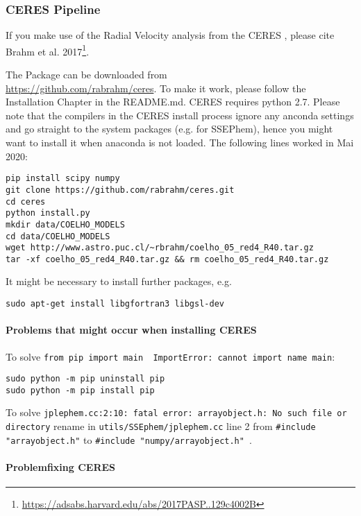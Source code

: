 \documentclass[10pt,a4paper]{article}
\begin{document}
\subsubsection{CERES Pipeline}
\label{Section:Explanation_CERES_pipeline}
If you make use of the Radial Velocity analysis from the CERES , please cite Brahm et al. 2017\footnote{\url{https://adsabs.harvard.edu/abs/2017PASP..129c4002B}}.

The Package can be downloaded from\\ \url{https://github.com/rabrahm/ceres}. To make it work, please follow the Installation Chapter in the README.md. CERES requires python 2.7. Please note that the compilers in the CERES install process ignore any anconda settings and go straight to the system packages (e.g. for SSEPhem), hence you might want to install it when anaconda is not loaded. The following lines worked in Mai 2020:
\begin{lstlisting}[style=base]
pip install scipy numpy
git clone https://github.com/rabrahm/ceres.git
cd ceres
python install.py
mkdir data/COELHO_MODELS
cd data/COELHO_MODELS
wget http://www.astro.puc.cl/~rbrahm/coelho_05_red4_R40.tar.gz
tar -xf coelho_05_red4_R40.tar.gz && rm coelho_05_red4_R40.tar.gz
\end{lstlisting}

It might be necessary to install further packages, e.g.
\begin{lstlisting}[style=base]
sudo apt-get install libgfortran3 libgsl-dev
\end{lstlisting}


\paragraph{Problems that might occur when installing CERES\\}

To solve \verb|from pip import main  ImportError: cannot import name main|:
\begin{lstlisting}[style=base]
sudo python -m pip uninstall pip
sudo python -m pip install pip
\end{lstlisting}

To solve \verb|jplephem.cc:2:10: fatal error: arrayobject.h: No such file or directory| rename in \verb|utils/SSEphem/jplephem.cc| line 2 from \verb|#include "arrayobject.h"| to \verb|#include "numpy/arrayobject.h"|~.

\paragraph{Problemfixing CERES\\}
\end{document}
